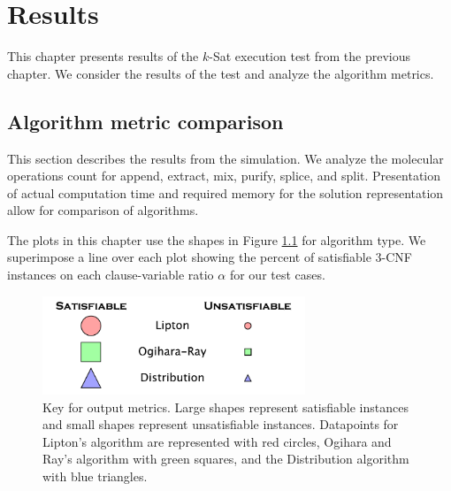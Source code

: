 \chapter{Results}

This chapter presents results of the $k$-{\sc Sat} execution test from the previous chapter.  We consider the results of the test and analyze the algorithm metrics. 

	\section{Algorithm metric comparison}
	
This section describes the results from the simulation.  We analyze the molecular operations count for append, extract, mix, purify, splice, and split.  Presentation of actual computation time and required memory for the solution representation allow for comparison of algorithms.

The plots in this chapter use the shapes in Figure \ref{metricKey} for algorithm type.  We superimpose a line over each plot showing the percent of satisfiable $3$-CNF instances on each clause-variable ratio $\alpha$ for our test cases.

\begin{figure}[htdp]

\begin{center}

\includegraphics[width=0.7\textwidth]{./figures/key.pdf}

\caption{Key for output metrics.  Large shapes represent satisfiable instances and small shapes represent unsatisfiable instances.  Datapoints for Lipton's algorithm are represented with red circles, Ogihara and Ray's algorithm with green squares, and the Distribution algorithm with blue triangles. }
\label{metricKey}
\end{center}
\end{figure}

